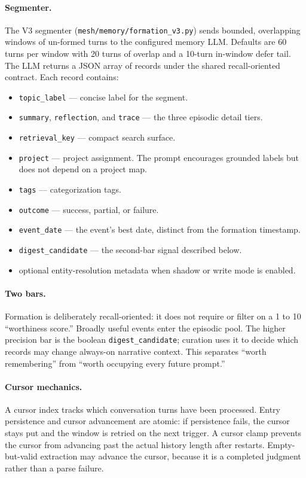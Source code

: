 \documentclass[11pt,letterpaper]{report}
\newcommand{\code}[1]{\texttt{#1}}
\begin{document}
\paragraph{Segmenter.}
The V3 segmenter (\code{mesh/memory/formation\_v3.py}) sends bounded,
overlapping windows of un-formed turns to the configured memory LLM. Defaults
are 60 turns per window with 20 turns of overlap and a 10-turn in-window defer
tail. The LLM returns a JSON array of records under the shared recall-oriented
contract. Each record contains:

\begin{itemize}[nosep]
  \item \code{topic\_label} --- concise label for the segment.
  \item \code{summary}, \code{reflection}, and \code{trace} --- the three
        episodic detail tiers.
  \item \code{retrieval\_key} --- compact search surface.
  \item \code{project} --- project assignment. The prompt encourages
        grounded labels but does not depend on a project map.
  \item \code{tags} --- categorization tags.
  \item \code{outcome} --- success, partial, or failure.
  \item \code{event\_date} --- the event's best date, distinct from the
        formation timestamp.
  \item \code{digest\_candidate} --- the second-bar signal described below.
  \item optional entity-resolution metadata when shadow or write mode is
        enabled.
\end{itemize}

\paragraph{Two bars.}
Formation is deliberately recall-oriented: it does not require or filter on a
1 to 10 ``worthiness score.'' Broadly useful events enter the episodic pool.
The higher precision bar is the boolean \code{digest\_candidate}; curation
uses it to decide which records may change always-on narrative context. This
separates ``worth remembering'' from ``worth occupying every future prompt.''

\paragraph{Cursor mechanics.}
A cursor index tracks which conversation turns have been processed.
Entry persistence and cursor advancement are atomic: if persistence
fails, the cursor stays put and the window is retried on the next
trigger. A cursor clamp prevents the cursor from advancing past the actual
history length after restarts. Empty-but-valid extraction may advance the
cursor, because it is a completed judgment rather than a parse failure.
\end{document}
